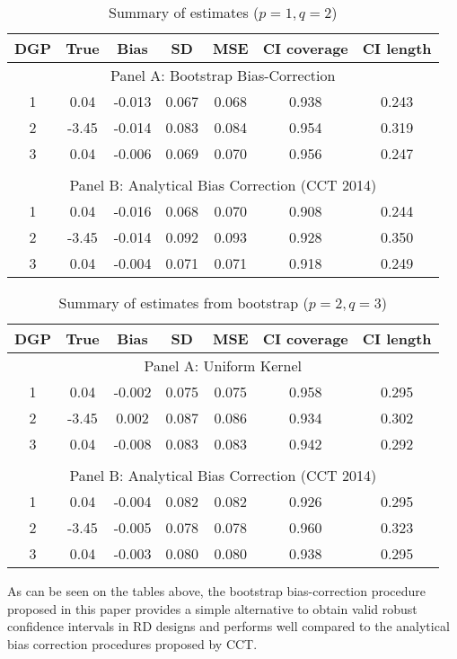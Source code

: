 \documentclass[12pt,fleqn]{article}
\begin{document}
\begin{table}[ht] \label{Tb1}
	\caption{Summary of estimates ($p = 1, q = 2$)}
	\centering
	\begin{tabular}{ccccccc}
		\hline
		DGP & True & Bias & SD & MSE & CI coverage & CI length \\ 
		\hline
		\multicolumn{7}{c}{Panel A: Bootstrap Bias-Correction} \\
		1 & 0.04 & -0.013 & 0.067 & 0.068 & 0.938 & 0.243 \\ 
		2 & -3.45 & -0.014 & 0.083 & 0.084 & 0.954 & 0.319 \\ 
		3 & 0.04 & -0.006 & 0.069 & 0.070 & 0.956 & 0.247 \\ 
		&&&&&& \\
		\multicolumn{7}{c}{Panel B: Analytical Bias Correction (CCT 2014)} \\
		1 & 0.04 & -0.016 & 0.068 & 0.070 & 0.908 & 0.244 \\ 
		2 & -3.45 & -0.014 & 0.092 & 0.093 & 0.928 & 0.350 \\ 
		3 & 0.04 & -0.004 & 0.071 & 0.071 & 0.918 & 0.249 \\ 
		\hline
	\end{tabular}
\end{table}

\begin{table}[ht]\label{Tb2}
	\caption{Summary of estimates from bootstrap ($p = 2, q = 3$)}
	\centering
	\begin{tabular}{ccccccc}
		\hline
		DGP & True & Bias & SD & MSE & CI coverage & CI length \\ 
		\hline
		\multicolumn{7}{c}{Panel A: Uniform Kernel} \\
		1 & 0.04 & -0.002 & 0.075 & 0.075 & 0.958 & 0.295 \\ 
		2 & -3.45 & 0.002 & 0.087 & 0.086 & 0.934 & 0.302 \\ 
		3 & 0.04 & -0.008 & 0.083 & 0.083 & 0.942 & 0.292 \\ 
		&&&&&& \\
		\multicolumn{7}{c}{Panel B: Analytical Bias Correction (CCT 2014)} \\
		1 & 0.04 & -0.004 & 0.082 & 0.082 & 0.926 & 0.295 \\ 		
		2 & -3.45 & -0.005 & 0.078 & 0.078 & 0.960 & 0.323 \\ 		
		3 & 0.04 & -0.003 & 0.080 & 0.080 & 0.938 & 0.295 \\ 
		\hline
	\end{tabular}
\end{table}
As can be seen on the tables above, the bootstrap bias-correction procedure
proposed in this paper provides a simple alternative to obtain valid robust
confidence intervals in RD designs and performs well compared to the analytical 
bias correction procedures proposed by CCT.
\end{document}
